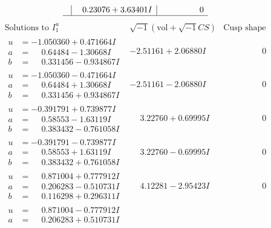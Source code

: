 \documentclass[1p]{elsarticle_modified}
\theoremstyle{definition}
\newcommand{\I}{\sqrt{-1}}
\begin{document}
$$\begin{array}{c|c|c}
 & \phantom{-}0.23076 + 3.63401 I & \phantom{-0.000000 } 0\\
 \hline 
 \end{array}$$\newpage$$\begin{array}{c|c|c}  
\text{Solutions to }I^u_{1}& \I (\text{vol} + \sqrt{-1}CS) & \text{Cusp shape}\\
 \hline 
\begin{aligned}
u &= -1.050360 + 0.471664 I \\
a &= \phantom{-}0.64484 - 1.30668 I \\
b &= \phantom{-}0.331456 - 0.934867 I\end{aligned}
 & -2.51161 + 2.06880 I & \phantom{-0.000000 } 0 \\ \hline\begin{aligned}
u &= -1.050360 - 0.471664 I \\
a &= \phantom{-}0.64484 + 1.30668 I \\
b &= \phantom{-}0.331456 + 0.934867 I\end{aligned}
 & -2.51161 - 2.06880 I & \phantom{-0.000000 } 0 \\ \hline\begin{aligned}
u &= -0.391791 + 0.739877 I \\
a &= \phantom{-}0.58553 - 1.63119 I \\
b &= \phantom{-}0.383432 - 0.761058 I\end{aligned}
 & \phantom{-}3.22760 + 0.69995 I & \phantom{-0.000000 } 0 \\ \hline\begin{aligned}
u &= -0.391791 - 0.739877 I \\
a &= \phantom{-}0.58553 + 1.63119 I \\
b &= \phantom{-}0.383432 + 0.761058 I\end{aligned}
 & \phantom{-}3.22760 - 0.69995 I & \phantom{-0.000000 } 0 \\ \hline\begin{aligned}
u &= \phantom{-}0.871004 + 0.777912 I \\
a &= \phantom{-}0.206283 - 0.510731 I \\
b &= \phantom{-}0.116298 + 0.296311 I\end{aligned}
 & \phantom{-}4.12281 - 2.95423 I & \phantom{-0.000000 } 0 \\ \hline\begin{aligned}
u &= \phantom{-}0.871004 - 0.777912 I \\
a &= \phantom{-}0.206283 + 0.510731 I \\

\end{aligned}
\end{array}$$
\end{document}

